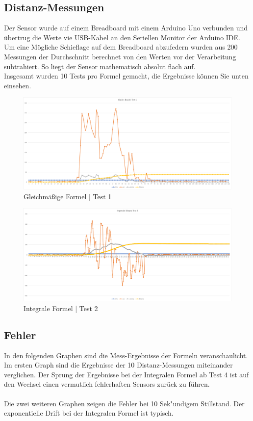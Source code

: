 \subsection{Distanz-Messungen}
Der Sensor wurde auf einem Breadboard mit einem Arduino Uno verbunden und übertrug die Werte
vie USB-Kabel an den Seriellen Monitor der Arduino IDE. Um eine Mögliche Schieflage auf dem
Breadboard abzufedern wurden aus 200 Messungen der Durchschnitt berechnet von den Werten vor
der Verarbeitung subtrahiert. So liegt der Sensor mathematisch absolut flach auf. \\
Insgesamt wurden 10 Tests pro Formel gemacht, die Ergebnisse können Sie unten einsehen.\\

\begin{figure} [h]
\centering
\includegraphics[width = 15cm]{Bilder/constDistance1}
\caption{Gleichmäßige Formel | Test 1}
\end{figure}

\begin{figure} [h]
    \centering
    \includegraphics[width = 15cm]{Bilder/integralDistance2}
    \caption{Integrale Formel | Test 2}
    \end{figure}

\subsection{Fehler}
In den folgenden Graphen sind die Mess-Ergebnisse der Formeln veranschaulicht. Im ersten Graph
sind die Ergebnisse der 10 Distanz-Messungen miteinander verglichen. Der Sprung der
Ergebnisse bei der Integralen Formel ab Test 4 ist auf den Wechsel einen vermutlich fehlerhaften
Sensors zurück zu führen.\\
\\
Die zwei weiteren Graphen zeigen die Fehler bei 10 Sek"undigem Stillstand. Der exponentielle Drift 
bei der Integralen Formel ist typisch.


